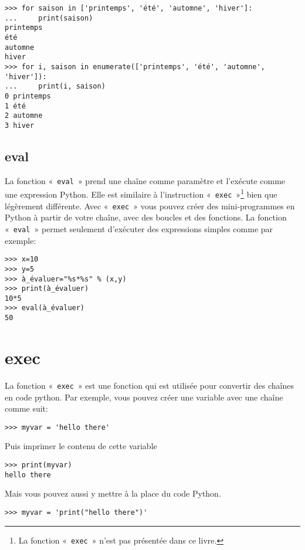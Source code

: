 \begin{Verbatim}[frame=single,rulecolor=\color{gray}]
>>> for saison in ['printemps', 'été', 'automne', 'hiver']:
...     print(saison)
printemps
été
automne
hiver
>>> for i, saison in enumerate(['printemps', 'été', 'automne', 'hiver']):
...     print(i, saison)
0 printemps
1 été
2 automne
3 hiver
\end{Verbatim}


\subsection*{eval}

La fonction «~\texttt{eval}~» prend une chaîne comme paramètre et l'exécute comme une expression Python. Elle est similaire à l'instruction «~\texttt{exec}~»\footnote{La fonction «~\texttt{exec}~» n'est pas présentée dans ce livre.} bien que légèrement différente. Avec «~\texttt{exec}~» vous pouvez créer des mini-programmes en Python à partir de votre chaîne, avec des boucles et des fonctions. La fonction «~\texttt{eval}~» permet seulement d'exécuter des expressions simples comme par exemple:
\begin{Verbatim}[frame=single,rulecolor=\color{gray}]
>>> x=10
>>> y=5
>>> à_évaluer="%s*%s" % (x,y)
>>> print(à_évaluer)
10*5
>>> eval(à_évaluer)
50
\end{Verbatim}

\section*{exec}

La fonction «~\texttt{exec}~» est une fonction qui est utilisée pour convertir des chaînes en code python. Par exemple, vous pouvez créer une variable avec une chaîne comme suit:
\begin{Verbatim}[frame=single,rulecolor=\color{gray}]
>>> myvar = 'hello there'
\end{Verbatim}

Puis imprimer le contenu de cette variable
\begin{Verbatim}[frame=single,rulecolor=\color{gray}]
>>> print(myvar)
hello there
\end{Verbatim}

Mais vous pouvez aussi y mettre à la place du code Python.
\begin{Verbatim}[frame=single,rulecolor=\color{gray}]
>>> myvar = 'print("hello there")'
\end{Verbatim}

